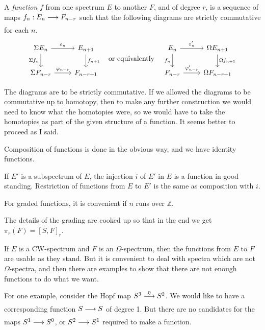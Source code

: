 \documentclass[../main]{subfiles}
\begin{document}
A \emph{function} $f$ from one spectrum $E$ to another $F$, and of degree $r$, is a sequence of maps $f_n: E_n\lar{} F_{n-r}$ such that the following diagrams are strictly commutative for each $n$.
\[
\begin{tikzcd}
	{\Sigma   E_n} & {E_{n+1}} \\
	{\Sigma   F_{n-r}} & {F_{n-r+1}}
	\arrow["{\varepsilon_n}", from=1-1, to=1-2]
	\arrow["{f_{n+1}}", from=1-2, to=2-2]
	\arrow["{\Sigma f_n}"', from=1-1, to=2-1]
	\arrow["{\varphi_{n-r}}", from=2-1, to=2-2]
\end{tikzcd}
\quad \text{or equivalently} \quad
\begin{tikzcd}
	{E_n} & {\Omega E_{n+1}} \\
	{F_{n-r}} & {\Omega F_{n-r+1}}
	\arrow["{\varepsilon_n'}", from=1-1, to=1-2]
	\arrow["{\Omega f_{n+1}}", from=1-2, to=2-2]
	\arrow["{f_n}"', from=1-1, to=2-1]
	\arrow["{\varphi_{n-r}'}", from=2-1, to=2-2]
\end{tikzcd}
\]
\begin{notes}
\item[(i)]   The diagrams are to be strictly commutative. If we allowed the diagrams to be commutative up to homotopy, then to make any further construction we would need to know what the homotopies were, so we would have to take the homotopies as part of the given structure of a function. It seems better to proceed as I said.
\item[(ii)]  Composition of functions is done in the obvious way, and we have identity functions.
\item[(iii)] If $E'$ is a subspectrum of $E$, the injection $i$ of $E'$ in $E$ is a function in good standing. Restriction of functions from $E$ to $E'$ is the same as composition with $i$.
\item[(iv)]  For graded functions, it is convenient if $n$ runs over $\mathbb Z$.
\item[(v)]   The details of the grading are cooked up so that in the end we get $\pi_r(F)=[S,F]_r$.
\end{notes}

If $E$ is a CW-spectrum and $F$ is an $\Omega$-spectrum, then the functions from $E$ to $F$ are usable as they stand. But it is convenient to deal with spectra which are not $\Omega$-spectra, and then there are examples to show that there are not enough functions to do what we want.

For one example, consider the Hopf map $S^3\lar{\eta}S^2$. We would like to have a corresponding function $S\lar{} S$ of degree 1. But there are no candidates for the maps $S^1\lar{} S^0$, or $S^2\lar{} S^1$ required to make a function.
\end{document}
